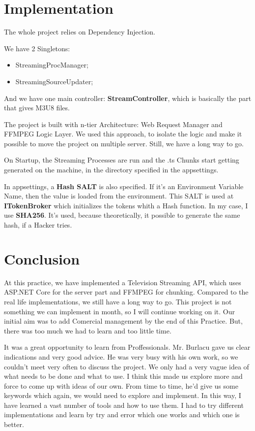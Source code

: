 \documentclass{article}
\begin{document}
	\section{Implementation}
		The whole project relies on Dependency Injection.

		We have 2 Singletons:
		\begin{itemize}
			\item StreamingProcManager;
			\item StreamingSourceUpdater;
		\end{itemize}

		And we have one main controller: \textbf{StreamController}, which is basically the part that gives M3U8 files.

		The project is built with n-tier Architecture: Web Request Manager and FFMPEG Logic Layer. We used this approach, to isolate the logic and make it possible to move the project on multiple server. Still, we have a long way to go.

		On Startup, the Streaming Processes are run and the .ts Chunks start getting generated on the machine, in the directory specified in the appsettings.

		In appsettings, a \textbf{Hash SALT} is also specified. If it's an Environment Variable Name, then the value is loaded from the environment. This SALT is used at \textbf{ITokenBroker} which initializes the tokens whith a Hash function. In my case, I use \textbf{SHA256}. It's used, because theoretically, it possible to generate the same hash, if a Hacker tries.

	\newpage
	\section{Conclusion}
		At this practice, we have implemented a Television Streaming API, which uses ASP.NET Core for the server part and FFMPEG for chunking. Compared to the real life implementations, we still have a long way to go. This project is not something we can implement in month, so I will continue working on it. Our initial aim was to add Comercial management by the end of this Practice. But, there was too much we had to learn and too little time.

		It was a great opportunity to learn from Proffessionals. Mr. Burlacu gave us clear indications and very good advice. He was very busy with his own work, so we couldn't meet very often to discuss the project. We only had a very vague idea of what needs to be done and what to use. I think this made us explore more and force to come up with ideas of our own. From time to time, he'd give us some keywords which again, we would need to explore and implement. In this way, I have learned a vast number of tools and how to use them. I had to try different implementations and learn by try and error which one works and which one is better.
\end{document}
